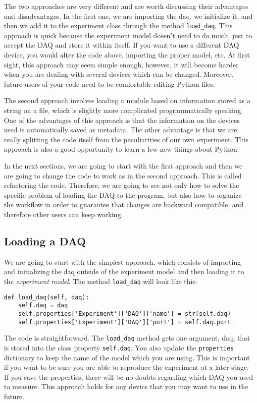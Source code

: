 {The two approaches are very different and are worth discussing their advantages and disadvantages. In the first one, we are
importing the daq, we initialize it, and then we add it to the experiment class through the method \texttt{load\_daq}. This approach is quick because the experiment model doesn't need to do much, just to accept the DAQ and store it within itself. If you want to use a different DAQ device, you would alter the code above, importing the proper model, etc. At first sight, this approach may seem simple enough, however, it will become harder when you are dealing with several devices which can be changed. Moreover, future users of your code need to be comfortable editing Python files. 

The second approach involves loading a module based on information stored as a string on a file, which is slightly more complicated programmatically speaking. One of the advantages of this approach is that the information on the devices used is automatically saved as metadata. The other advantage is that we are really splitting the code itself from the peculiarities of our own experiment. This approach is also a good opportunity to learn a few new things about Python. 

In the next sections, we are going to start with the first approach and then we are going to change the code to work as in the second approach. This is called refactoring the code. Therefore, we are going to see not only how to solve the specific problem of loading the DAQ to the program, but also how to organize the workflow in order to guarantee that changes are backward compatible, and therefore other users can keep working. 

\subsection{Loading a DAQ}\label{loading-a-daq}
We are going to start with the simplest approach, which consists of importing and initializing the daq outside of the experiment model and then loading it to the \emph{experiment model}. The method \texttt{load_daq} will look like this:

\begin{verbatim}
def load_daq(self, daq):
    self.daq = daq
    self.properties['Experiment']['DAQ']['name'] = str(self.daq)
    self.properties['Experiment']['DAQ']['port'] = self.daq.port
\end{verbatim}

The code is straightforward. The \texttt{load_daq} method gets one
argument, daq, that is stored into the class property \texttt{self.daq}.
You also update the \texttt{properties} dictionary to keep the name of
the model which you are using. This is important if you want to be sure you are able to reproduce the experiment at a later stage. If you save the properties, there will be no doubts regarding which DAQ you used to measure. This approach holds for any device that you may want to use in the future. 

}
